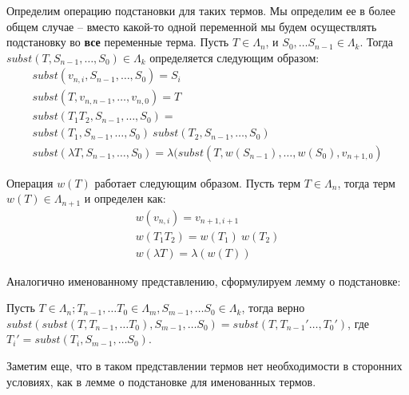 Определим операцию подстановки для таких термов. Мы определим ее в более общем случае -- вместо какой-то одной переменной мы будем осуществлять подстановку во \textbf{все} переменные терма. Пусть $T \in \Lambda_{n}$, и $S_{0}, \dots S_{n-1} \in \Lambda_{k}$. Тогда $subst(T, S_{n - 1}, \dots, S_{0}) \in \Lambda_{k}$ определяется следующим образом:
\begin{gather*}
  subst(v_{n, i}, S_{n - 1}, \dots, S_{0}) = S_{i} \\
  subst(T, v_{n, n-1}, \dots, v_{n, 0}) = T \\
  subst(T_{1} T_{2}, S_{n - 1}, \dots, S_{0}) = \\
  subst(T_{1}, S_{n - 1}, \dots, S_{0})\ subst(T_{2}, S_{n - 1}, \dots, S_{0}) \\
  subst(\lambda T, S_{n - 1}, \dots, S_{0}) = \lambda (subst(T, w(S_{n - 1}), \dots, w(S_{0}), v_{n+1, 0})
\end{gather*}

Операция $w(T)$ работает следующим образом. Пусть терм $T \in \Lambda_{n}$, тогда терм $w(T) \in \Lambda_{n+1}$ и определен как:
\begin{gather*}
  w(v_{n, i}) = v_{n+1, i+1} \\
  w(T_{1} T_{2}) = w(T_1)\ w(T_2) \\
  w(\lambda T) = \lambda (w(T))
\end{gather*}

Аналогично именованному представлению, сформулируем лемму о подстановке:

\begin{prop}
  \label{index:assoc}
  Пусть $T \in \Lambda_{n}; T_{n - 1}, \dots T_{0} \in \Lambda_{m}, S_{m-1}, \dots S_{0} \in \Lambda_{k}$, тогда верно $subst(subst(T, T_{n - 1}, \dots T_{0}), S_{m-1}, \dots S_{0}) = subst(T, T_{n - 1}' \dots, T_{0}')$, где $T_{i}' = subst(T_{i}, S_{m-1}, \dots S_{0})$.
\end{prop}

Заметим еще, что в таком представлении термов нет необходимости в сторонних условиях, как в лемме о подстановке для именованных термов.

